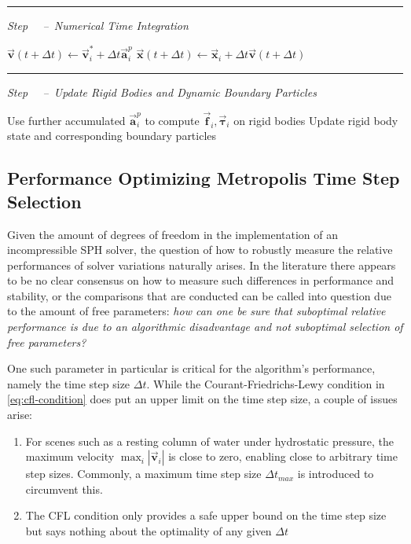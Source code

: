 \documentclass[oneside, a4paper]{book}
\newcounter{phase}[algorithm]
\newlength{\phaserulewidth}
\newcommand{\Phase}[1]{%
  \vspace{-1.25ex}
  \Statex\leavevmode\llap{\rule{\dimexpr\labelwidth+\labelsep}{\phaserulewidth}}\rule{\linewidth}{\phaserulewidth}
  \Statex\strut\refstepcounter{phase}\textit{Step ~\thephase~--~#1}%
  }
\newcommand\abs[1]{\left|#1\right|}
\newcommand\vek[1]{\vec{\bm{#1}}}
\newcommand\br[1]{\left(#1\right)}
\begin{document}
\begin{algorithm}
\begin{algorithmic}[1]
      \Phase{Numerical Time Integration}
      \State $\vek{v}\br{t+\Delta t} \gets \vek{v}_i^* +\Delta t \vek{a}_i^p$ 
      \State $\vek{x}\br{t+\Delta t} \gets \vek{x}_i +\Delta t \vek{v}\br{t+\Delta t}$ 

      \Phase{Update Rigid Bodies and Dynamic Boundary Particles}
      \State Use further accumulated $\vek{a}_i^{p}$ to compute $\vek{f}_i, \vek{\tau}_i$ on rigid bodies
      \State Update rigid body state and corresponding boundary particles 

    \end{algorithmic}
  \end{algorithm}



    \subsection{Performance Optimizing Metropolis Time Step Selection}\label{sec:optimal-time-step-controller}
    Given the amount of degrees of freedom in the implementation of an incompressible SPH solver, the question of how to robustly measure the relative performances of solver variations naturally arises. In the literature there appears to be no clear consensus on how to measure such differences in performance and stability, or the comparisons that are conducted can be called into question due to the amount of free parameters: \textit{how can one be sure that suboptimal relative performance is due to an algorithmic disadvantage and not suboptimal selection of free parameters?}

    One such parameter in particular is critical for the algorithm's performance, namely the time step size $\Delta t$. While the Courant-Friedrichs-Lewy condition in \autoref{eq:cfl-condition} does put an upper limit on the time step size, a couple of issues arise:
    \begin{enumerate}
      \item For scenes such as a resting column of water under hydrostatic pressure, the maximum velocity $\max_i\abs{\vek{v}_i}$ is close to zero, enabling close to arbitrary time step sizes. Commonly, a maximum time step size $\Delta t_{max}$ is introduced to circumvent this.
      \item The CFL condition only provides a safe upper bound on the time step size but says nothing about the optimality of any given $\Delta t$
    \end{enumerate}
\end{document}
